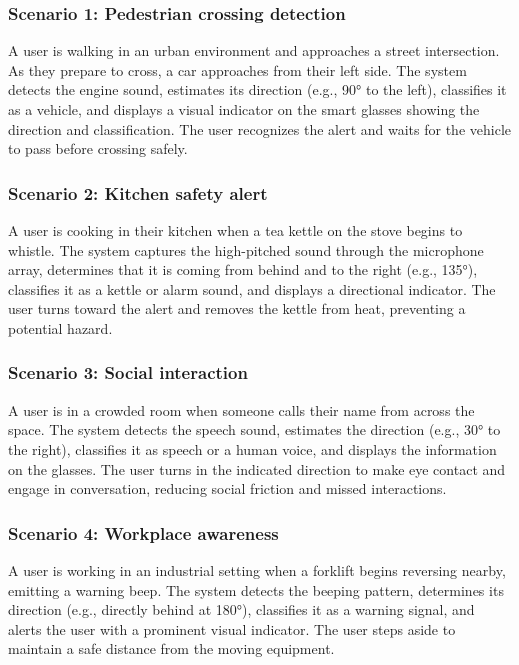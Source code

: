 \documentclass[12pt]{article}
\theoremstyle{definition}
\begin{document}
\subsubsection{Scenario 1: Pedestrian crossing detection}
A user is walking in an urban environment and approaches a street intersection.
As they prepare to cross, a car approaches from their left side. The system
detects the engine sound, estimates its direction (e.g., 90° to the left),
classifies it as a vehicle, and displays a visual indicator on the smart glasses
showing the direction and classification. The user recognizes the alert and
waits for the vehicle to pass before crossing safely.

\subsubsection{Scenario 2: Kitchen safety alert}
A user is cooking in their kitchen when a tea kettle on the stove begins to
whistle. The system captures the high-pitched sound through the microphone
array, determines that it is coming from behind and to the right (e.g., 135°),
classifies it as a kettle or alarm sound, and displays a directional indicator.
The user turns toward the alert and removes the kettle from heat, preventing a
potential hazard.

\subsubsection{Scenario 3: Social interaction}
A user is in a crowded room when someone calls their name from across the space.
The system detects the speech sound, estimates the direction (e.g., 30° to the
right), classifies it as speech or a human voice, and displays the information
on the glasses. The user turns in the indicated direction to make eye contact
and engage in conversation, reducing social friction and missed interactions.

\subsubsection{Scenario 4: Workplace awareness}
A user is working in an industrial setting when a forklift begins reversing
nearby, emitting a warning beep. The system detects the beeping pattern,
determines its direction (e.g., directly behind at 180°), classifies it as a
warning signal, and alerts the user with a prominent visual indicator. The user
steps aside to maintain a safe distance from the moving equipment.
\end{document}
